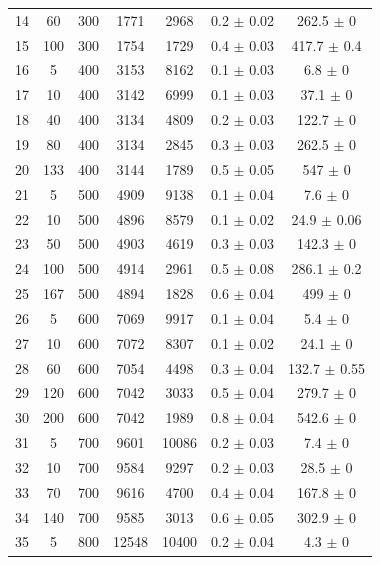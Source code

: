 \documentclass[11pt]{article}
\begin{document}
\begin{table}[]
{\begin{tabular}{ccccccc}
				\rowcolor[HTML]{EFEFEF} 
				14 & 60 & 300 & 1771 & 2968 & 0.2 $\pm$ 0.02 & 262.5 $\pm$ 0 \\
				\rowcolor[HTML]{EFEFEF} 
				15 & 100 & 300 & 1754 & 1729 & 0.4 $\pm$ 0.03 & 417.7 $\pm$ 0.4 \\
				16 & 5 & 400 & 3153 & 8162 & 0.1 $\pm$ 0.03 & 6.8 $\pm$ 0 \\
				17 & 10 & 400 & 3142 & 6999 & 0.1 $\pm$ 0.03 & 37.1 $\pm$ 0 \\
				18 & 40 & 400 & 3134 & 4809 & 0.2 $\pm$ 0.03 & 122.7 $\pm$ 0 \\
				19 & 80 & 400 & 3134 & 2845 & 0.3 $\pm$ 0.03 & 262.5 $\pm$ 0 \\
				20 & 133 & 400 & 3144 & 1789 & 0.5 $\pm$ 0.05 & 547 $\pm$ 0 \\
				\rowcolor[HTML]{EFEFEF} 
				21 & 5 & 500 & 4909 & 9138 & 0.1 $\pm$ 0.04 & 7.6 $\pm$ 0 \\
				\rowcolor[HTML]{EFEFEF} 
				22 & 10 & 500 & 4896 & 8579 & 0.1 $\pm$ 0.02 & 24.9 $\pm$ 0.06 \\
				\rowcolor[HTML]{EFEFEF} 
				23 & 50 & 500 & 4903 & 4619 & 0.3 $\pm$ 0.03 & 142.3 $\pm$ 0 \\
				\rowcolor[HTML]{EFEFEF} 
				24 & 100 & 500 & 4914 & 2961 & 0.5 $\pm$ 0.08 & 286.1 $\pm$ 0.2 \\
				\rowcolor[HTML]{EFEFEF} 
				25 & 167 & 500 & 4894 & 1828 & 0.6 $\pm$ 0.04 & 499 $\pm$ 0 \\
				26 & 5 & 600 & 7069 & 9917 & 0.1 $\pm$ 0.04 & 5.4 $\pm$ 0 \\
				27 & 10 & 600 & 7072 & 8307 & 0.1 $\pm$ 0.02 & 24.1 $\pm$ 0 \\
				28 & 60 & 600 & 7054 & 4498 & 0.3 $\pm$ 0.04 & 132.7 $\pm$ 0.55 \\
				29 & 120 & 600 & 7042 & 3033 & 0.5 $\pm$ 0.04 & 279.7 $\pm$ 0 \\
				30 & 200 & 600 & 7042 & 1989 & 0.8 $\pm$ 0.04 & 542.6 $\pm$ 0 \\
				\rowcolor[HTML]{EFEFEF} 
				31 & 5 & 700 & 9601 & 10086 & 0.2 $\pm$ 0.03 & 7.4 $\pm$ 0 \\
				\rowcolor[HTML]{EFEFEF} 
				32 & 10 & 700 & 9584 & 9297 & 0.2 $\pm$ 0.03 & 28.5 $\pm$ 0 \\
				\rowcolor[HTML]{EFEFEF} 
				33 & 70 & 700 & 9616 & 4700 & 0.4 $\pm$ 0.04 & 167.8 $\pm$ 0 \\
				\rowcolor[HTML]{EFEFEF} 
				34 & 140 & 700 & 9585 & 3013 & 0.6 $\pm$ 0.05 & 302.9 $\pm$ 0 \\
				35 & 5 & 800 & 12548 & 10400 & 0.2 $\pm$ 0.04 & 4.3 $\pm$ 0 \\

\end{tabular}}
\end{table}
\end{document}
